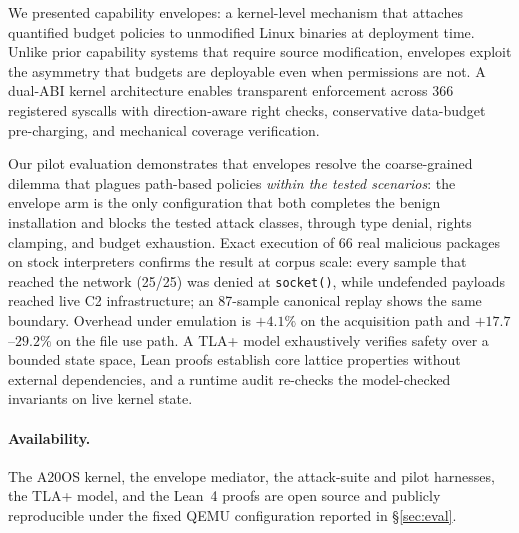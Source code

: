 \documentclass[letterpaper,twocolumn,10pt]{article}
\begin{document}
We presented capability envelopes: a kernel-level mechanism that
attaches quantified budget policies to unmodified Linux binaries at
deployment time.  Unlike prior capability systems that require source
modification, envelopes exploit the asymmetry that budgets are
deployable even when permissions are not.  A dual-ABI kernel
architecture enables transparent enforcement across 366 registered
syscalls with direction-aware right checks, conservative data-budget
pre-charging, and mechanical coverage verification.

Our pilot evaluation demonstrates that envelopes resolve the
coarse-grained dilemma that plagues path-based policies \emph{within
the tested scenarios}: the envelope arm is the only configuration that
both completes the benign installation and blocks the tested attack
classes, through type denial, rights clamping, and budget exhaustion.
Exact execution of 66 real malicious packages on stock interpreters
confirms the result at corpus scale: every sample that reached the
network (25/25) was denied at \texttt{socket()}, while undefended
payloads reached live C2 infrastructure; an 87-sample canonical replay
shows the same boundary.
Overhead under emulation is $+4.1\%$ on the acquisition path and
$+17.7$--$29.2\%$ on the file use path.  A TLA+ model exhaustively
verifies safety over a bounded state space, Lean proofs establish core
lattice properties without external dependencies, and a runtime audit
re-checks the model-checked invariants on live kernel state.

\paragraph{Availability.}
The A20OS kernel, the envelope mediator, the attack-suite and pilot
harnesses, the TLA+ model, and the Lean~4 proofs are open source and
publicly reproducible under the fixed QEMU configuration reported in
\S\ref{sec:eval}.
\end{document}
